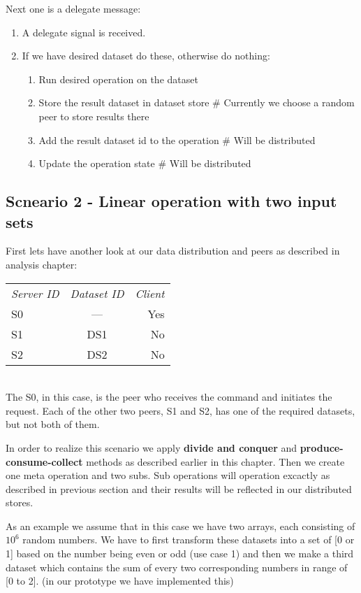 Next one is a delegate message:
\begin{enumerate}
\item A delegate signal is received.
\item If we have desired dataset do these, otherwise do nothing:
  \begin{enumerate}
  \item Run desired operation on the dataset
  \item Store the result dataset in dataset store \# Currently we choose a random peer to store results there
  \item Add the result dataset id to the operation \# Will be distributed
  \item Update the operation state \# Will be distributed
  \end{enumerate}
\end{enumerate}

\subsection{Scneario 2 - Linear operation with two input sets}
First lets have another look at our data distribution and peers as described in analysis chapter:

\begin{tabular}{ l c r }
\em{Server ID} & \em{ Dataset ID} & \em{ Client} \\
S0 & --- & Yes \\
S1 & DS1 & No \\
S2 & DS2 & No \\
\end{tabular}\\

The S0, in this case, is the peer who receives the command and initiates the request. 
Each of the other two peers, S1 and S2, has one of the required datasets, but not both of them. 

In order to realize this scenario we apply \textbf{divide and conquer} and \textbf{produce-consume-collect} methods
as described earlier in this chapter. Then we create one meta operation and two subs. Sub operations will operation excactly as described in previous section
and their results will be reflected in our distributed stores.

As an example we assume that in this case we have two arrays, each consisting of \(10^6\) random numbers. 
We have to first transform these datasets into a set of [0 or 1] based on the number being even or odd (use case 1) 
and then we make a third dataset which contains the sum of every two corresponding numbers in range of [0 to 2].
(in our prototype we have implemented this)

